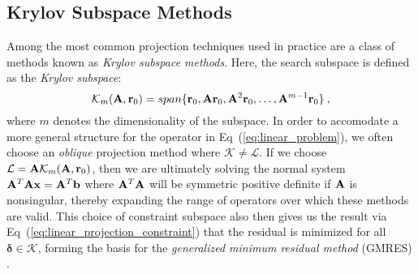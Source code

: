 \subsection{Krylov Subspace Methods}
\label{subsec:krylov_methods}
Among the most common projection techniques used in practice are a
class of methods known as \textit{Krylov subspace methods}. Here, the
search subspace is defined as the \textit{Krylov subspace}:
\begin{equation}
  \mathcal{K}_m(\mathbf{A},\mathbf{r}_0) = span\{\mathbf{r}_0, \mathbf{A}\mathbf{r}_0,
  \mathbf{A}^2\mathbf{r}_0, \dots, \mathbf{A}^{m-1}\mathbf{r}_0\}\:,
  \label{eq:krylov_subspace}
\end{equation}
where $m$ denotes the dimensionality of the subspace. In order to
accomodate a more general structure for the operator in
Eq~(\ref{eq:linear_problem}), we often choose an \textit{oblique}
projection method where $\mathcal{K} \neq \mathcal{L}$. If we choose
$\mathcal{L} = \mathbf{A} \mathcal{K}_m(\mathbf{A},\mathbf{r}_0)$, then we are
ultimately solving the normal system $\mathbf{A}^T\mathbf{A}\mathbf{x} =
\mathbf{A}^T\mathbf{b}$ where $\mathbf{A}^T\mathbf{A}$ will be symmetric positive
definite if $\mathbf{A}$ is nonsingular, thereby expanding the range of
operators over which these methods are valid. This choice of
constraint subspace also then gives us the result via
Eq~(\ref{eq:linear_projection_constraint}) that the residual is
minimized for all $\boldsymbol{\delta} \in \mathcal{K}$, forming the
basis for the \textit{generalized minimum residual method} (GMRES)
\citep{saad_gmres:_1986}.

